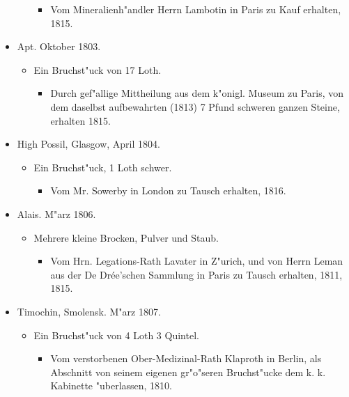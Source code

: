 \documentclass[a4paper, 11pt, oneside, polutonikogreek, german]{article}
\begin{document}
\begin{itemize}
\begin{itemize}
        \begin{itemize}
            \item Vom Mineralienh"andler Herrn Lambotin in Paris zu Kauf erhalten, 1815.
        \end{itemize}
    \end{itemize}
    \item Apt. Oktober 1803.
    \begin{itemize}
        \item Ein Bruchst"uck von 17 Loth.
        \begin{itemize}
            \item Durch gef"allige Mittheilung aus dem k"onigl. Museum zu Paris, von dem daselbst aufbewahrten (1813) 7 Pfund schweren ganzen Steine, erhalten 1815.
        \end{itemize}
    \end{itemize}
    \item High Possil, Glasgow, April 1804.
    \begin{itemize}
        \item Ein Bruchst"uck, 1 Loth schwer.
        \begin{itemize}
            \item Vom Mr. Sowerby in London zu Tausch erhalten, 1816.
        \end{itemize}
    \end{itemize}
    \item Alais. M"arz 1806.
    \begin{itemize}
        \item Mehrere kleine Brocken, Pulver und Staub.
        \begin{itemize}
            \item Vom Hrn. Legations-Rath Lavater in Z"urich, und von Herrn Leman aus der De Drée'schen Sammlung in Paris zu Tausch erhalten, 1811, 1815.
        \end{itemize}
    \end{itemize}
    \item Timochin, Smolensk. M"arz 1807.
    \begin{itemize}
        \item Ein Bruchst"uck von 4 Loth 3 Quintel.
        \begin{itemize}
            \item Vom verstorbenen Ober-Medizinal-Rath Klaproth in Berlin, als Abschnitt von seinem eigenen gr"o"seren Bruchst"ucke dem k. k. Kabinette "uberlassen, 1810.
        \end{itemize}

\end{itemize}
\end{itemize}
\end{document}
